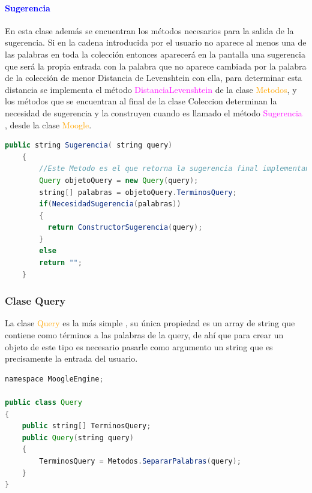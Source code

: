 \documentclass[a4paper, 12pt]{article}
\begin{document}
\paragraph{\textcolor{blue}{Sugerencia} }\label{sub:center}
En esta clase además se encuentran los métodos necesarios para la salida de la sugerencia. Si en la cadena introducida por el usuario no aparece al menos una de las palabras en toda la colección entonces aparecerá en la pantalla una sugerencia que será la propia entrada con la palabra que no aparece cambiada por la palabra de la colección de menor Distancia de Levenshtein con ella, para determinar esta distancia se implementa el método \textcolor{magenta}{DistanciaLevenshtein} de la clase \textcolor{orange}{Metodos}, y los métodos que se encuentran al final de la clase Coleccion determinan la necesidad de sugerencia y la construyen cuando es llamado el método  \textcolor{magenta}{Sugerencia} , desde la clase \textcolor{orange}{Moogle}. 
\begin{lstlisting}[language=Java]
public string Sugerencia( string query)
    {
        //Este Metodo es el que retorna la sugerencia final implementando todos los anteriores y es llamado desde Moogle
        Query objetoQuery = new Query(query);
        string[] palabras = objetoQuery.TerminosQuery;
        if(NecesidadSugerencia(palabras))
        {
          return ConstructorSugerencia(query); 
        }
        else
        return "";
    }
\end{lstlisting}

\subsubsection{Clase Query}\label{sub;query}
La clase \textcolor{orange}{Query} es la más simple , su única propiedad es un array de string que contiene como términos a las palabras de la query, de ahí que para crear un objeto de este tipo es necesario pasarle como argumento un string que es precisamente la entrada del usuario.
\begin{lstlisting}[language=Java]
namespace MoogleEngine;

public class Query
{
    public string[] TerminosQuery;
    public Query(string query)
    {
        TerminosQuery = Metodos.SepararPalabras(query);
    }
}
\end{lstlisting}
\end{document}
